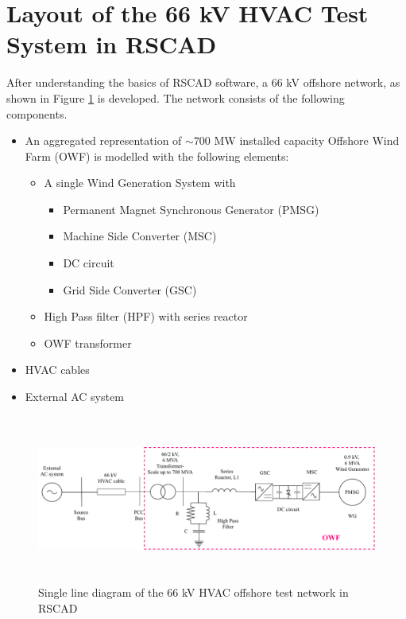 \section{Layout of the 66 kV HVAC Test System in RSCAD}\label{RSCAD_ACsourcemodel}\label{WT1_ACsource_RSCAD_Test_Layout}
After understanding the basics of RSCAD software, a 66 kV offshore network, as shown in Figure \ref{fig:WT1_Model_RSCAD} is developed. The network consists of the following components.

\begin{itemize}
    \item An aggregated representation of $\sim{700}$ MW installed capacity Offshore Wind Farm (\gls{OWF}) is modelled with the following elements:
    \begin{itemize}
        \item A single Wind Generation System with 
    \begin{itemize}
        \item Permanent Magnet Synchronous Generator (\gls{PMSG})
        \item Machine Side Converter (\gls{MSC})
        \item \gls{DC} circuit
        \item Grid Side Converter (\gls{GSC}) 
    \end{itemize}
        \item High Pass filter (\gls{HPF}) with series reactor
        \item \gls{OWF} transformer
    \end{itemize}
    \item \gls{HVAC} cables  
     \item External \gls{AC} system
\end{itemize}

\begin{figure}[H]
\centering
    \includegraphics[height = 5.5cm,width = \textwidth]{Diagrams/Chapter_3/WT1_AC_RSCAD_OWF.pdf}
    \caption{Single line diagram of the 66 kV HVAC offshore test network in RSCAD}
    \label{fig:WT1_Model_RSCAD}
\end{figure}

